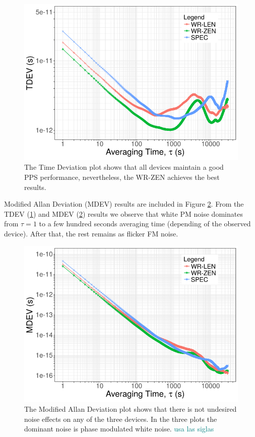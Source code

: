 \begin{figure}
    \centering
    \includegraphics[width=0.7\linewidth]{img/tdev_exp1}
    \caption[TDEV for the WR devices comparison.]{The Time Deviation plot shows 
        that all devices maintain a good PPS performance, nevertheless, the 
        WR-ZEN 
        achieves the best results.}
    \label{fig:tdev_exp1}
\end{figure}


Modified Allan Deviation (MDEV) results are included in Figure 
\ref{fig:mdev_exp1}. From the TDEV (\ref{fig:tdev_exp1}) and MDEV (\ref{fig:mdev_exp1}) results we observe that white PM noise dominates from $\tau=1$ to a few hundred  seconds averaging time (depending of the observed device). After that, the rest remains as flicker FM noise.

\begin{figure}
    \centering
    \includegraphics[width=0.7\linewidth]{img/mdev_exp1}
    \caption[MDEV for the WR devices comparison.]{The Modified Allan Deviation 
        plot shows that there is not undesired noise effects on any of the three 
        devices. 
        In the three plots the dominant noise is phase modulated white noise. 
        \textcolor{teal}{usa las siglas}}
    \label{fig:mdev_exp1}
\end{figure}


